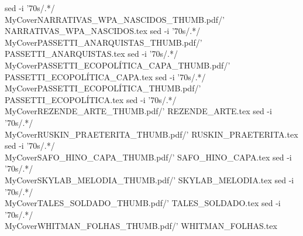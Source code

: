sed -i '70s/.*/\\MyCover{NARRATIVAS_WPA_NASCIDOS_THUMB.pdf}/' NARRATIVAS_WPA_NASCIDOS.tex
sed -i '70s/.*/\\MyCover{PASSETTI_ANARQUISTAS_THUMB.pdf}/' PASSETTI_ANARQUISTAS.tex
sed -i '70s/.*/\\MyCover{PASSETTI_ECOPOLÍTICA_CAPA_THUMB.pdf}/' PASSETTI_ECOPOLÍTICA_CAPA.tex
sed -i '70s/.*/\\MyCover{PASSETTI_ECOPOLÍTICA_THUMB.pdf}/' PASSETTI_ECOPOLÍTICA.tex
sed -i '70s/.*/\\MyCover{REZENDE_ARTE_THUMB.pdf}/' REZENDE_ARTE.tex
sed -i '70s/.*/\\MyCover{RUSKIN_PRAETERITA_THUMB.pdf}/' RUSKIN_PRAETERITA.tex
sed -i '70s/.*/\\MyCover{SAFO_HINO_CAPA_THUMB.pdf}/' SAFO_HINO_CAPA.tex
sed -i '70s/.*/\\MyCover{SKYLAB_MELODIA_THUMB.pdf}/' SKYLAB_MELODIA.tex
sed -i '70s/.*/\\MyCover{TALES_SOLDADO_THUMB.pdf}/' TALES_SOLDADO.tex
sed -i '70s/.*/\\MyCover{WHITMAN_FOLHAS_THUMB.pdf}/' WHITMAN_FOLHAS.tex